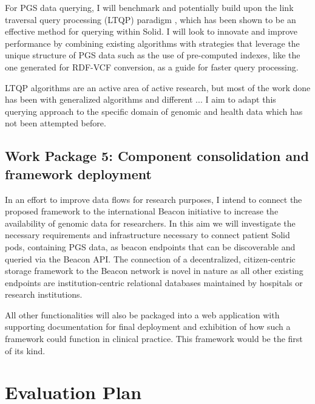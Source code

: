 \documentclass[runningheads]{llncs}
\begin{document}
For PGS data querying, I will benchmark and potentially build upon the link traversal query processing (LTQP) paradigm \cite{taelman_evaluation_2023}, which has been shown to be an effective method for querying within Solid.  
I will look to innovate and improve performance by combining existing algorithms with strategies that leverage the unique structure of PGS data such as the use of pre-computed indexes, like the one generated for RDF-VCF conversion, as a guide for faster query processing.

LTQP algorithms are an active area of active research, but most of the work done has been with generalized algorithms and different ...
I aim to adapt this querying approach to the specific domain of genomic and health data which has not been attempted before. 


\subsection{Work Package 5: Component consolidation and framework deployment}

In an effort to improve data flows for research purposes, I intend to connect the proposed framework to the international Beacon initiative \cite{rambla_beacon_2022} to increase the availability of genomic data for researchers. 
In this aim we will investigate the necessary requirements and infrastructure necessary to connect patient Solid pods, containing PGS data, as beacon endpoints that can be discoverable and queried via the Beacon API. 
The connection of a decentralized, citizen-centric storage framework to the Beacon network is novel in nature as all other existing endpoints are institution-centric relational databases maintained by hospitals or research institutions.

All other functionalities will also be packaged into a web application with supporting documentation for final deployment and exhibition of how such a framework could function in clinical practice.
This framework would be the first of its kind.

\section{Evaluation Plan}

\end{document}
